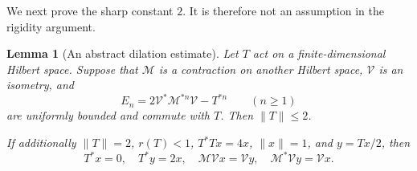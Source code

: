 \documentclass[11pt]{article}
\newtheorem{lemma}[theorem]{Lemma}
\theoremstyle{definition}
\theoremstyle{remark}
\begin{document}
We next prove the sharp constant \(2\).  It is therefore not an assumption in
the rigidity argument.

\begin{lemma}[An abstract dilation estimate]\label{lem:dilation}
Let \(T\) act on a finite-dimensional Hilbert space.  Suppose that \(\mathcal M\) is a
contraction on another Hilbert space, \(\mathcal V\) is an isometry, and
\[
 E_n=2\mathcal V^*\mathcal M^{*n}\mathcal V-T^{*n}\qquad(n\geq1)
\]
are uniformly bounded and commute with \(T\).  Then \(\|T\|\leq2\).

If additionally \(\|T\|=2\), \(r(T)<1\), \(T^*Tx=4x\), \(\|x\|=1\), and
\(y=Tx/2\), then
\[
 T^*x=0,\quad T^*y=2x,\quad
 \mathcal M\mathcal Vx=\mathcal Vy,\quad
 \mathcal M^*\mathcal Vy=\mathcal Vx.
\]
\end{lemma}
\end{document}
